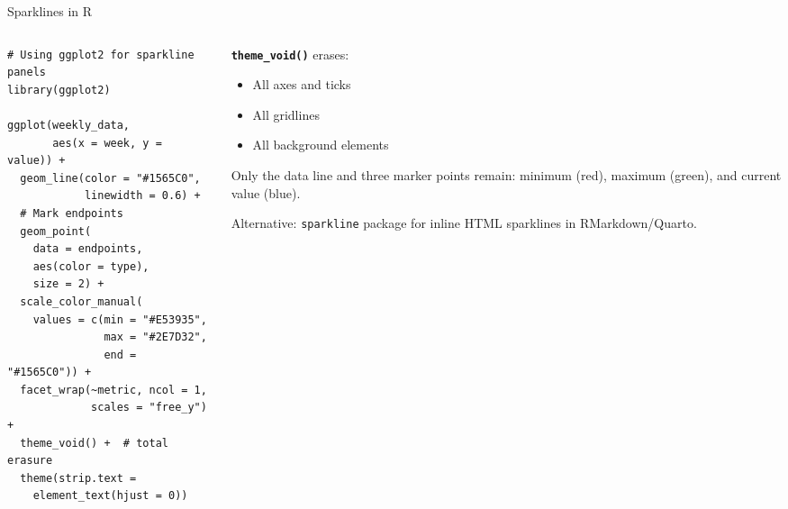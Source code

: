 \documentclass[10pt]{beamer}
\begin{document}
\begin{frame}[fragile]{Sparklines in R}
  \begin{columns}[T]
    \begin{column}{0.52\textwidth}
\begin{lstlisting}[style=rstyle]
# Using ggplot2 for sparkline panels
library(ggplot2)

ggplot(weekly_data,
       aes(x = week, y = value)) +
  geom_line(color = "#1565C0",
            linewidth = 0.6) +
  # Mark endpoints
  geom_point(
    data = endpoints,
    aes(color = type),
    size = 2) +
  scale_color_manual(
    values = c(min = "#E53935",
               max = "#2E7D32",
               end = "#1565C0")) +
  facet_wrap(~metric, ncol = 1,
             scales = "free_y") +
  theme_void() +  # total erasure
  theme(strip.text =
    element_text(hjust = 0))
\end{lstlisting}
    \end{column}
    \begin{column}{0.45\textwidth}
      \textbf{\texttt{theme\_void()}} erases:
      \begin{itemize}
        \item All axes and ticks
        \item All gridlines
        \item All background elements
      \end{itemize}

      \vspace{4pt}
      Only the data line and three marker
      points remain: minimum (red), maximum
      (green), and current value (blue).

      \vspace{4pt}
      {\small Alternative: \texttt{sparkline}
      package for inline HTML sparklines
      in RMarkdown/Quarto.}
    \end{column}
  \end{columns}
\end{frame}
\end{document}
